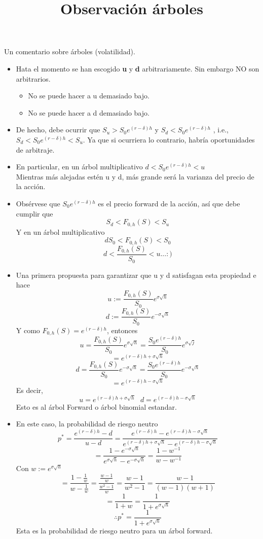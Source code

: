 \documentclass[12pts]{extarticle}
\author{}
\date{}
\title{Observación árboles}
\begin{document}
\maketitle
Un comentario sobre árboles (volatilidad). 
\begin{itemize}
\item Hata el momento se han escogido \textbf{u} y \textbf{d} arbitrariamente. Sin embargo NO son arbitrarios. 
\begin{itemize}
\item No se puede hacer a u demasiado bajo.
\item No se puede hacer a d demasiado bajo.
\end{itemize}
\item De hecho, debe ocurrir que $S_u > S_0 e^{(r-\delta)h}$ y $S_d < S_0 e^{(r-\delta)h}$ , i.e., $S_d < S_0 e^{(r- \delta)h} < S_u $. Ya que si ocurriera lo contrario, habría oportunidades de arbitraje. 
\item En particular, en un árbol multiplicativo $d < S_0 e^{(r-\delta)h} < u $ \\ Mientras más alejadas estén u y d, más grande será la varianza del precio de la acción. 
\item Obsérvese que $S_0 e^{(r-\delta)h}$ es el precio forward de la acción, así que debe cumplir que $$ S_d < F_{0,h}(S) < S_u$$ Y en un árbol multiplicativo $$ dS_0 < F_{0,h}(S) <S_0$$ $$d<\frac{F_{0,h}(S)}{S_0}<u... :)$$ 
\item Una primera propuesta para garantizar que u y d satisfagan esta propiedad e hace 
$$u:= \frac{F_{0,h}(S)}{S_0}e^{\sigma \sqrt{h}}$$
$$d:=\frac{F_{0,h}(S)}{S_0}e^{-\sigma \sqrt{h}}$$
Y como $F_{0,h}(S)=e^{(r-\delta)h}$, entonces 
$$u=\frac{F_{0,h}(S)}{S_0}e^{\sigma \sqrt{h}} = \frac{S_0 e^{(r-\delta)h}}{S_0}e^{\sigma \sqrt{j}}$$
$$=e^{(r-\delta)h + \sigma \sqrt{h}}$$
$$d=\frac{F_{0,h}(S)}{S_0}e^{-\sigma \sqrt{h}}=\frac{S_0 e^{(r-\delta)h}}{S_0}e^{-\sigma \sqrt{h}}$$
$$=e^{(r-\delta)h-\sigma \sqrt{h}}$$
Es decir, 
$$u=e^{(r-\delta)h + \sigma \sqrt{h}} \, \, \, \, d=e^{(r-\delta)h-\sigma \sqrt{h}}$$
Esto es al árbol Forward o árbol binomial estandar. 
\item En este caso, la probabilidad de riesgo neutro
$$p^{*}=\frac{e^{(r-\delta)h}-d}{u-d}=\frac{e^{(r-\delta)h}-e^{(r-\delta)h-\sigma \sqrt{h}}}{e^{(r-\delta)h + \sigma \sqrt{h}}-e^{(r-\delta)h-\sigma \sqrt{h}}}$$
$$=\frac{1-e^{-\sigma \sqrt{h}}}{e^{\sigma \sqrt{h}}-e^{-\sigma \sqrt{h}}}=\frac{1-w^{-1}}{w-w^{-1}}$$ Con $w:=e^{\sigma \sqrt{h}}$ 
$$=\frac{1-\frac{1}{w}}{w-\frac{1}{w}}=\frac{\frac{w-1}{w}}{\frac{w^2-1}{w}}=\frac{w-1}{w^2-1}=\frac{w-1}{(w-1)(w+1)}$$
$$=\frac{1}{1+w}=\frac{1}{1+e^{\sigma \sqrt{h}}}$$
$$ \therefore p^{*}=\frac{1}{1+e^{\sigma \sqrt{h}}}$$
Esta es la probabilidad de riesgo neutro para un árbol forward.
\end{itemize}
\end{document}
